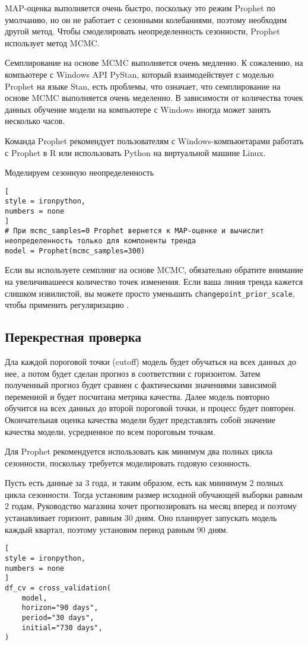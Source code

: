 \documentclass[%
	11pt,
	a4paper,
	utf8,
		]{article}
\begin{document}
MAP-оценка выполняется очень быстро, поскольку это режим Prophet по умолчанию, но он не работает с сезонными колебаниями, поэтому необходим другой метод. Чтобы смоделировать неопределенность сезонности, Prophet использует метод MCMC.

Семплирование на основе MCMC выполняется очень медленно. К сожалению, на компьютере с Windows API PyStan, который взаимодействует с моделью Prophet на языке Stan, есть проблемы, что означает, что семплирование на основе MCMC выполняется очень меделенно. В зависимости от количества точек данных обучение модели на компьютере с Windows иногда может занять несколько часов.

Команда Prophet рекомендует пользователям с Windows-компьюетарами работать с Prophet в R или использовать Python на виртуальной машине Linux.

Моделируем сезонную неопределенность
\begin{lstlisting}[
style = ironpython,
numbers = none
]
# При mcmc_samples=0 Prophet вернется к MAP-оценке и вычислит неопределенность только для компоненты тренда
model = Prophet(mcmc_samples=300)
\end{lstlisting}

Если вы используете семплинг на основе MCMC, обязательно обратите внимание на увеличивашееся количество точек изменения. Если ваша линия тренда кажется слишком извилистой, вы можете просто уменьшить \verb|changepoint_prior_scale|, чтобы применить регуляризацию \cite[]{gruzdev:time-series-2022}.

\subsection{Перекрестная проверка}

Дла каждой пороговой точки (cutoff) модель будет обучаться на всех данных до нее, а потом будет сделан прогноз в соответствии с горизонтом. Затем полученный прогноз будет сравнен с фактическими значениями зависимой переменной и будет посчитана метрика качества. Далее модель повторно обучится на всех данных до второй пороговой точки, и процесс будет повторен. Окончательная оценка качества модели будет представлять собой значение качества модели, усредненное по всем пороговым точкам.

Для Prophet рекомендуется использовать как минимум два полных цикла сезонности, поскольку требуется моделировать годовую сезонность.

Пусть есть данные за 3 года, и таким образом, есть как миинимум 2 полных цикла сезонности. Тогда установим размер исходной обучающей выборки равным 2 годам, Руководство магазина хочет прогнозировать на месяц вперед и поэтому устанавливает горизонт, равным 30 дням. Оно планирует запускать модель каждый квартал, поэтому установим период равным 90 дням.
\begin{lstlisting}[
style = ironpython,
numbers = none
]
df_cv = cross_validation(
    model,
    horizon="90 days",
    period="30 days",
    initial="730 days",
)
\end{lstlisting}
\end{document}
